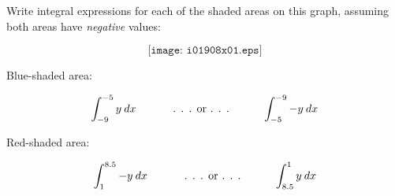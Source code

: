 

Write integral expressions for each of the shaded areas on this graph, assuming both areas have {\it negative} values:

$$\texttt{[image: i01908x01.eps]}$$







Blue-shaded area:

$$\int_{-9}^{-5} y \> dx \hskip 30pt \hbox{ . . . or . . .} \hskip 30pt \int_{-5}^{-9} -y \> dx$$

\vskip 30pt

Red-shaded area:

$$\int_{1}^{8.5} -y \> dx \hskip 30pt \hbox{ . . . or . . .} \hskip 30pt \int_{8.5}^{1} y \> dx$$











